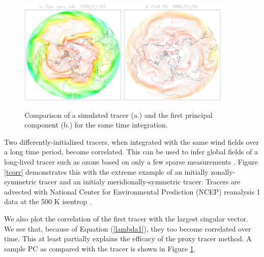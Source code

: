 \begin{figure}
\includegraphics[width=0.45\textwidth]{tsample.eps}
\includegraphics[width=0.45\textwidth]{pc1.eps}
\caption{Comparison of a simulated tracer (a.) and the first principal
component (b.) for the same time integration.}\label{pc1}
\end{figure}

Two differently-initialized tracers, when integrated with the same
wind fields over a long time period, become correlated.
This can be used to infer global fields of a long-lived tracer such as
ozone based on only a few sparse measurements 
\citep{Allen_Nakamura2003,Randall_etal2002}.
Figure \ref{tcorr} demonstrates this with the extreme example of an initially
zonally-symmetric tracer and an initialy meridionally-symmetric tracer.
Tracers are advected with National Center for Environmental Prediction
(NCEP) reanalysis 1 data at the 500 K isentrop \citep{Kalnay_etal1996}.

We also plot the correlation of the first tracer with the largest singular
vector.  We see that, because of Equation (\ref{lambda1}), they too become
correlated over time.
This at least partially explains the efficacy of the proxy tracer method.
A sample PC as compared with the tracer is shown in Figure \ref{pc1}.  

